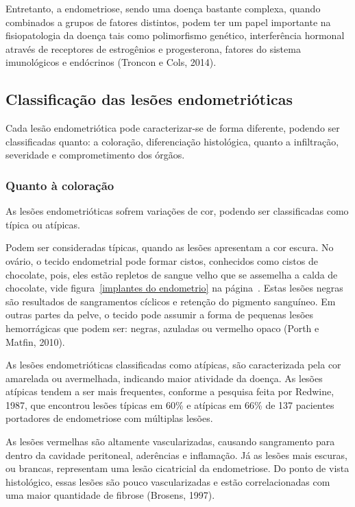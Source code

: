 \documentclass[12pt]{article} %
\begin{document}
Entretanto, a endometriose, sendo uma doença bastante complexa, 
quando combinados a grupos de fatores distintos, podem ter um papel
importante na fisiopatologia da doença tais como polimorfismo 
genético, interferência hormonal através de receptores de estrogênios
e progesterona, fatores do sistema imunológicos e endócrinos (Troncon
e Cols, 2014).

\subsection{Classificação das lesões endometrióticas}
Cada lesão endometriótica pode caracterizar-se de forma diferente, podendo ser classificadas
quanto: a coloração, diferenciação histológica, quanto a infiltração, severidade e comprometimento dos órgãos.


\subsubsection{Quanto à coloração} 

As lesões endometrióticas sofrem variações de cor, podendo ser classificadas como típica ou atípicas.

Podem ser consideradas típicas, quando as lesões apresentam a cor
escura.  No ovário, o tecido endometrial pode formar cistos,
conhecidos como cistos de chocolate, pois, eles estão repletos de
sangue velho que se assemelha a calda de chocolate, vide
figura~\ref{implantes do endometrio} na página~\pageref{implantes do
  endometrio}. Estas lesões negras são resultados de sangramentos
cíclicos e retenção do pigmento sanguíneo. Em outras partes da pelve,
o tecido pode assumir a forma de pequenas lesões hemorrágicas que
podem ser: negras, azuladas ou vermelho opaco (Porth e Matfin, 2010).

As lesões endometrióticas classificadas como atípicas, são
caracterizada pela cor amarelada ou avermelhada, indicando maior
atividade da doença. As lesões atípicas tendem a ser mais frequentes,
conforme a pesquisa feita por Redwine, 1987, que encontrou lesões
típicas em 60\% e atípicas em 66\% de 137 pacientes portadores de
endometriose com múltiplas lesões.

As lesões vermelhas são altamente vascularizadas, causando sangramento
para dentro da cavidade peritoneal, aderências e inflamação. Já as
lesões mais escuras, ou brancas, representam uma lesão cicatricial
da endometriose. Do ponto de vista histológico, essas lesões são pouco
vascularizadas e estão correlacionadas com uma maior quantidade de
fibrose (Brosens, 1997).
\end{document}
